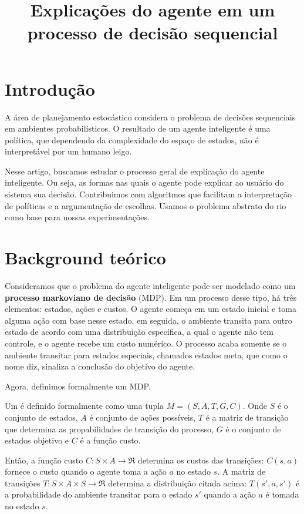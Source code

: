 \documentclass{article}
\title{\textbf{Explicações do agente em um processo de decisão sequencial}}
\begin{document}
\maketitle

\section{Introdução}

A área de planejamento estocástico considera o problema de decisões sequenciais em ambientes probabilísticos. O resultado de um agente inteligente é uma política, que dependendo da complexidade do espaço de estados, não é interpretável por um humano leigo.

Nesse artigo, buscamos estudar o processo geral de explicação do agente inteligente. Ou seja, as formas nas quais o agente pode explicar ao usuário do sistema sua decisão. Contribuimos com algoritmos que facilitam a interpretação de políticas e a argumentação de escolhas.
Usamos o problema abstrato do rio como base para nossas experimentações.

\section{Background teórico}

Consideramos que o problema do agente inteligente pode ser modelado como um \textbf{processo markoviano de decisão} (MDP). Em um processo desse tipo, há três elementos: estados, ações e custos. O agente começa em um estado inicial e toma alguma ação com base nesse estado, em seguida, o ambiente transita para outro estado de acordo com uma distribuição específica, a qual o agente não tem controle, e o agente recebe um custo numérico. O processo acaba somente se o ambiente transitar para estados especiais, chamados estados meta, que como o nome diz, sinaliza a conclusão do objetivo do agente. 

Agora, definimos formalmente um MDP.

Um  é definido formalmente como uma tupla $M = (S, A, T, G, C)$. Onde $S$ é o conjunto de estados, $A$ é conjunto de ações possíveis, $T$ é a matriz de transição que determina as propabilidades de transição do processo, $G$ é o conjunto de estados objetivo e $C$ é a função custo. 

Então, a função custo $C: S \times A \rightarrow \Re$ determina os custos das transições: $C(s,a)$ fornece o custo quando o agente toma a ação $a$ no estado $s$. A matriz de transições $T: S \times A \times S \rightarrow \Re$ determina a distribuição citada acima: $T(s',a,s')$ é a probabilidade do ambiente transitar para o estado $s'$ quando a ação $a$ é tomada no estado $s$.
\end{document}
